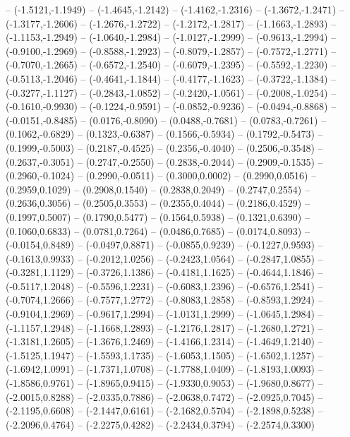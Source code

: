 {	-- (-1.5121,-1.1949)
	-- (-1.4645,-1.2142)
	-- (-1.4162,-1.2316)
	-- (-1.3672,-1.2471)
	-- (-1.3177,-1.2606)
	-- (-1.2676,-1.2722)
	-- (-1.2172,-1.2817)
	-- (-1.1663,-1.2893)
	-- (-1.1153,-1.2949)
	-- (-1.0640,-1.2984)
	-- (-1.0127,-1.2999)
	-- (-0.9613,-1.2994)
	-- (-0.9100,-1.2969)
	-- (-0.8588,-1.2923)
	-- (-0.8079,-1.2857)
	-- (-0.7572,-1.2771)
	-- (-0.7070,-1.2665)
	-- (-0.6572,-1.2540)
	-- (-0.6079,-1.2395)
	-- (-0.5592,-1.2230)
	-- (-0.5113,-1.2046)
	-- (-0.4641,-1.1844)
	-- (-0.4177,-1.1623)
	-- (-0.3722,-1.1384)
	-- (-0.3277,-1.1127)
	-- (-0.2843,-1.0852)
	-- (-0.2420,-1.0561)
	-- (-0.2008,-1.0254)
	-- (-0.1610,-0.9930)
	-- (-0.1224,-0.9591)
	-- (-0.0852,-0.9236)
	-- (-0.0494,-0.8868)
	-- (-0.0151,-0.8485)
	-- (0.0176,-0.8090)
	-- (0.0488,-0.7681)
	-- (0.0783,-0.7261)
	-- (0.1062,-0.6829)
	-- (0.1323,-0.6387)
	-- (0.1566,-0.5934)
	-- (0.1792,-0.5473)
	-- (0.1999,-0.5003)
	-- (0.2187,-0.4525)
	-- (0.2356,-0.4040)
	-- (0.2506,-0.3548)
	-- (0.2637,-0.3051)
	-- (0.2747,-0.2550)
	-- (0.2838,-0.2044)
	-- (0.2909,-0.1535)
	-- (0.2960,-0.1024)
	-- (0.2990,-0.0511)
	-- (0.3000,0.0002)
	-- (0.2990,0.0516)
	-- (0.2959,0.1029)
	-- (0.2908,0.1540)
	-- (0.2838,0.2049)
	-- (0.2747,0.2554)
	-- (0.2636,0.3056)
	-- (0.2505,0.3553)
	-- (0.2355,0.4044)
	-- (0.2186,0.4529)
	-- (0.1997,0.5007)
	-- (0.1790,0.5477)
	-- (0.1564,0.5938)
	-- (0.1321,0.6390)
	-- (0.1060,0.6833)
	-- (0.0781,0.7264)
	-- (0.0486,0.7685)
	-- (0.0174,0.8093)
	-- (-0.0154,0.8489)
	-- (-0.0497,0.8871)
	-- (-0.0855,0.9239)
	-- (-0.1227,0.9593)
	-- (-0.1613,0.9933)
	-- (-0.2012,1.0256)
	-- (-0.2423,1.0564)
	-- (-0.2847,1.0855)
	-- (-0.3281,1.1129)
	-- (-0.3726,1.1386)
	-- (-0.4181,1.1625)
	-- (-0.4644,1.1846)
	-- (-0.5117,1.2048)
	-- (-0.5596,1.2231)
	-- (-0.6083,1.2396)
	-- (-0.6576,1.2541)
	-- (-0.7074,1.2666)
	-- (-0.7577,1.2772)
	-- (-0.8083,1.2858)
	-- (-0.8593,1.2924)
	-- (-0.9104,1.2969)
	-- (-0.9617,1.2994)
	-- (-1.0131,1.2999)
	-- (-1.0645,1.2984)
	-- (-1.1157,1.2948)
	-- (-1.1668,1.2893)
	-- (-1.2176,1.2817)
	-- (-1.2680,1.2721)
	-- (-1.3181,1.2605)
	-- (-1.3676,1.2469)
	-- (-1.4166,1.2314)
	-- (-1.4649,1.2140)
	-- (-1.5125,1.1947)
	-- (-1.5593,1.1735)
	-- (-1.6053,1.1505)
	-- (-1.6502,1.1257)
	-- (-1.6942,1.0991)
	-- (-1.7371,1.0708)
	-- (-1.7788,1.0409)
	-- (-1.8193,1.0093)
	-- (-1.8586,0.9761)
	-- (-1.8965,0.9415)
	-- (-1.9330,0.9053)
	-- (-1.9680,0.8677)
	-- (-2.0015,0.8288)
	-- (-2.0335,0.7886)
	-- (-2.0638,0.7472)
	-- (-2.0925,0.7045)
	-- (-2.1195,0.6608)
	-- (-2.1447,0.6161)
	-- (-2.1682,0.5704)
	-- (-2.1898,0.5238)
	-- (-2.2096,0.4764)
	-- (-2.2275,0.4282)
	-- (-2.2434,0.3794)
	-- (-2.2574,0.3300)
}
